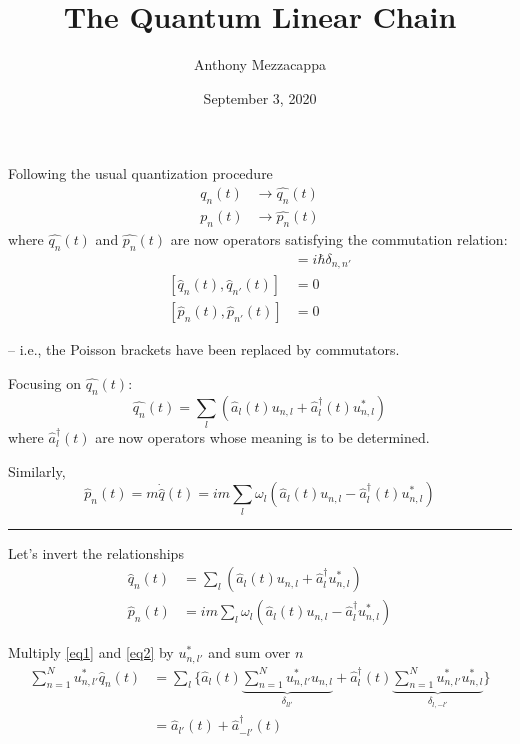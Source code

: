 \documentclass{article}
\title{The Quantum Linear Chain}
\author{Anthony Mezzacappa}
\date{September 3, 2020}
\begin{document}
\setlength{\parskip}{1em}
\maketitle

\noindent Following the usual quantization procedure
\begin{align*}
    q_n(t) &\longrightarrow \hat{q_n}(t) \\
    p_n(t) &\longrightarrow \hat{p_n}(t)
\end{align*}
where $\hat{q_n}(t)$ and $\hat{p_n}(t)$ are now operators satisfying the commutation relation:
\begin{align*}
    [ \hat{q_n} (t), \hat{p_{n'}}(t)] &= i\hbar \delta_{n,n'} \\
    [ \hat{q}_n (t), \hat{q}_{n'} (t) ] &= 0 \\
    [ \hat{p}_n (t), \hat{p}_{n'} (t) ] &= 0 
\end{align*}

\noindent -- i.e., the Poisson brackets have been replaced by commutators.

\noindent Focusing on $\hat{q_n} (t)$:
\begin{equation*}
    \hat{q_n} (t) = \sum_l \left( \hat{a}_l (t) u_{ n, l } + \hat{a}^\dagger_l (t) u^*_{ n, l } \right)
\end{equation*}
where $\hat{a}^\dagger_l (t)$ are now operators whose meaning is to be determined.

\noindent Similarly,
\begin{equation*}
    \hat{p}_n (t) = m \dot{\hat{q}} (t) = i m \sum_l \omega_l \left( \hat{a}_l (t) u_{ n, l } - \hat{a}^\dagger_l (t) u^*_{ n, l }  \right)
\end{equation*}


\noindent\rule{\textwidth}{.5pt}

\noindent Let's invert the relationships
\begin{align}
    \hat{q}_n (t) &= \sum_l \left( \hat{a}_l (t) u_{ n, l } + \hat{a}^\dagger_l u^*_{ n, l } \right) \label{eq1} \\ %
    \hat{p}_n (t) &= i m \sum_l \omega_l \left( \hat{a}_l (t) u_{ n, l } - \hat{a}^\dagger_l u^*_{ n, l } \right) \label{eq2} %
\end{align}

\noindent Multiply \eqref{eq1} and \eqref{eq2} by $ u^*_{ n, l' } $ and sum over $n$
\begin{align}
    \sum_{ n = 1 }^N u^*_{ n, l' } \hat{q}_n (t) &= \sum_l \biggl\lbrace \hat{a}_l (t) {\underbrace{ \sum_{ n = 1 }^N u^*_{ n, l' } u_{ n, l } }_{\delta_{ l l' } }} + \hat{a}^\dagger_l (t) {\underbrace{ \sum_{ n = 1 }^N u^*_{ n, l' } u^*_{ n, l } }_{ \delta_{ l, -l' } }} \biggr\rbrace \nonumber \\
    &= \hat{a}_{l'} (t) + \hat{a}^\dagger_{-l'} (t) \label{eq3} %
\end{align}
\end{document}
